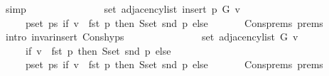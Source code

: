 \begin{isabellebody}
\ simp\isanewline
\ \ \isamarkupfalse%
\ \isamarkupfalse%
\isanewline
\ \ \ \ {\isachardoublequoteopen}{\isachardot}{\kern0pt}{\isachardot}{\kern0pt}{\isachardot}{\kern0pt}\ {\isacharequal}{\kern0pt}\isanewline
\ \ \ \ \ set\ {\isacharparenleft}{\kern0pt}adjacency{\isacharunderscore}{\kern0pt}list\ {\isacharparenleft}{\kern0pt}insert{\isacharunderscore}{\kern0pt}{}\ p\ G{\isacharparenright}{\kern0pt}\ v{\isacharparenright}{\kern0pt}\ {\isasymunion}\isanewline
\ \ \ \ \ {\isacharparenleft}{\kern0pt}{\isasymUnion}p{\isasymin}set\ ps{\isachardot}{\kern0pt}\ if\ v\ {\isacharequal}{\kern0pt}\ fst\ p\ then\ S{\isachardot}{\kern0pt}set\ {\isacharparenleft}{\kern0pt}snd\ p{\isacharparenright}{\kern0pt}\ else\ {\isacharbraceleft}{\kern0pt}{\isacharbraceright}{\kern0pt}{\isacharparenright}{\kern0pt}{\isachardoublequoteclose}\isanewline
\ \ \ \ \isamarkupfalse%
\ Cons{\isachardot}{\kern0pt}prems{\isacharparenleft}{\kern0pt}{}{\isacharparenright}{\kern0pt}\ prems\isanewline
\ \ \ \ \isamarkupfalse%
\ {\isacharparenleft}{\kern0pt}intro\ invar{\isacharunderscore}{\kern0pt}insert{\isacharunderscore}{\kern0pt}{}\ Cons{\isachardot}{\kern0pt}hyps{\isacharparenright}{\kern0pt}\isanewline
\ \ \isamarkupfalse%
\ \isamarkupfalse%
\isanewline
\ \ \ \ {\isachardoublequoteopen}{\isachardot}{\kern0pt}{\isachardot}{\kern0pt}{\isachardot}{\kern0pt}\ {\isacharequal}{\kern0pt}\isanewline
\ \ \ \ \ set\ {\isacharparenleft}{\kern0pt}adjacency{\isacharunderscore}{\kern0pt}list\ G\ v{\isacharparenright}{\kern0pt}\ {\isasymunion}\isanewline
\ \ \ \ \ {\isacharparenleft}{\kern0pt}if\ v\ {\isacharequal}{\kern0pt}\ fst\ p\ then\ S{\isachardot}{\kern0pt}set\ {\isacharparenleft}{\kern0pt}snd\ p{\isacharparenright}{\kern0pt}\ else\ {\isacharbraceleft}{\kern0pt}{\isacharbraceright}{\kern0pt}{\isacharparenright}{\kern0pt}\ {\isasymunion}\isanewline
\ \ \ \ \ {\isacharparenleft}{\kern0pt}{\isasymUnion}p{\isasymin}set\ ps{\isachardot}{\kern0pt}\ if\ v\ {\isacharequal}{\kern0pt}\ fst\ p\ then\ S{\isachardot}{\kern0pt}set\ {\isacharparenleft}{\kern0pt}snd\ p{\isacharparenright}{\kern0pt}\ else\ {\isacharbraceleft}{\kern0pt}{\isacharbraceright}{\kern0pt}{\isacharparenright}{\kern0pt}{\isachardoublequoteclose}\isanewline
\ \ \ \ \isamarkupfalse%
\ Cons{\isachardot}{\kern0pt}prems{\isacharparenleft}{\kern0pt}{}{\isacharparenright}{\kern0pt}\ prems{\isacharparenleft}{\kern0pt}{}{\isacharparenright}{\kern0pt}\isanewline
\ \ \ \ \isamarkupfalse%

\end{isabellebody}
